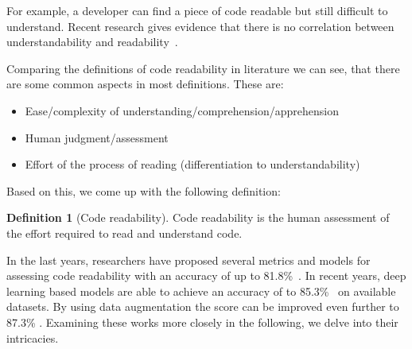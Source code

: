 \documentclass[%
class=scrreprt,
chapterprefix=false,%
open=right,%
twoside=false,%
paper=a4,%
logofile={Logo\_zentral\_farbig\_EN.png},%
thesistype=master,%
UKenglish,%
]{se2thesis}
\theoremstyle{definition}
\newtheorem{definition}{Definition}[section]
\begin{document}
	For example, a developer can find a piece of code readable but still difficult to understand. Recent research gives evidence that there is no correlation between understandability and readability~\cite{scalabrino2017automatically}.	
	
	
		

	Comparing the definitions of code readability in literature we can see, that there are some common aspects in most definitions. These are:
	\begin{itemize}
		\item Ease/complexity of understanding/comprehension/apprehension
		\item Human judgment/assessment
		\item Effort of the process of reading (differentiation to understandability)
	\end{itemize}
	Based on this, we come up with the following definition: 
	\begin{definition}[Code readability]
		Code readability is the human assessment of the effort required to read and understand code.
	\end{definition}

	In the last years, researchers have proposed several metrics and models for assessing code readability with an accuracy of up to 81.8\%~\cite{buse2009learning, posnett2011simpler, dorn2012general, }. In recent years, deep learning based models are able to achieve an accuracy of to 85.3\%~\cite{mi2018improving, mi2022towards} on available datasets. By using data augmentation the score can be improved even further to 87.3\% \cite{mi2021effectiveness}.
	Examining these works more closely in the following, we delve into their intricacies.
	
\end{document}
